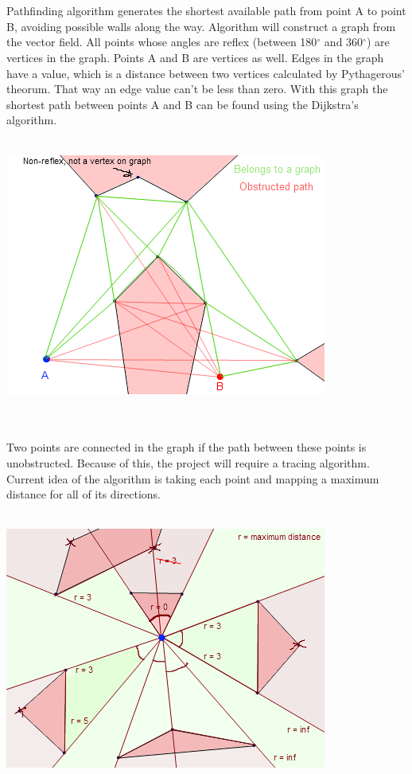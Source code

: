 \documentclass[a4paper,12pt]{article}
\begin{document}
\\
\\
Pathfinding algorithm generates the shortest available path from point A to point B,
avoiding possible walls along the way. Algorithm will construct a graph from the vector field.
All points whose angles are reflex (between 180$^\circ$ and 360$^\circ$) are vertices in the graph. Points A and B are vertices as well. Edges in the graph have a value, which is a distance between two vertices calculated by Pythagerous' theorum. That way an edge value can't be less than zero. With this graph the shortest path between points A and B can be found using the Dijkstra's algorithm.
\\
\\
\centerline{\includegraphics[scale=0.65]{graph.png}} \hspace*{\fill}
\\
\\
Two points are connected in the graph if the path between these points is unobstructed.
Because of this, the project will require a tracing algorithm. Current idea of the algorithm is taking each point and mapping a maximum distance for all of its directions.
\\
\\
\centerline{\includegraphics[scale=0.65]{trace.png}} \hspace*{\fill}
\end{document}
